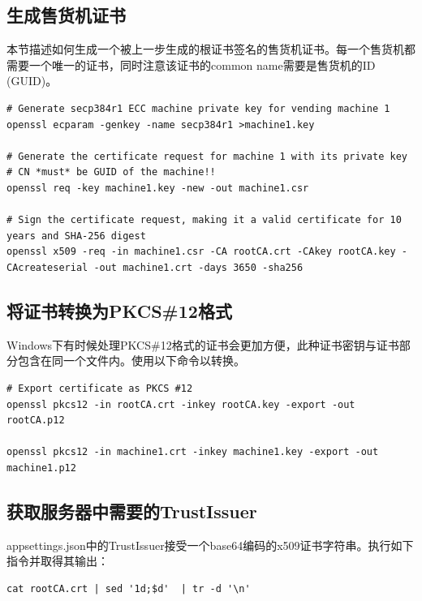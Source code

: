 \documentclass[a4paper,11pt]{article}
\theoremstyle{definition}
\begin{document}
\subsection{生成售货机证书}

本节描述如何生成一个被上一步生成的根证书签名的售货机证书。每一个售货机都需要一个唯一的证书，同时注意该证书的common name需要是售货机的ID (GUID)。

\begin{lstlisting}
# Generate secp384r1 ECC machine private key for vending machine 1
openssl ecparam -genkey -name secp384r1 >machine1.key

# Generate the certificate request for machine 1 with its private key
# CN *must* be GUID of the machine!!
openssl req -key machine1.key -new -out machine1.csr

# Sign the certificate request, making it a valid certificate for 10 years and SHA-256 digest
openssl x509 -req -in machine1.csr -CA rootCA.crt -CAkey rootCA.key -CAcreateserial -out machine1.crt -days 3650 -sha256
\end{lstlisting}

\subsection{将证书转换为PKCS\#12格式}

Windows下有时候处理PKCS\#12格式的证书会更加方便，此种证书密钥与证书部分包含在同一个文件内。使用以下命令以转换。

\begin{lstlisting}
# Export certificate as PKCS #12
openssl pkcs12 -in rootCA.crt -inkey rootCA.key -export -out rootCA.p12

openssl pkcs12 -in machine1.crt -inkey machine1.key -export -out machine1.p12
\end{lstlisting}

\subsection{获取服务器中需要的TrustIssuer}

appsettings.json中的TrustIssuer接受一个base64编码的x509证书字符串。执行如下指令并取得其输出：

\begin{lstlisting}
cat rootCA.crt | sed '1d;$d'  | tr -d '\n'
\end{lstlisting}


\cleardoublepage
{}
\listoffigures
\end{document}

